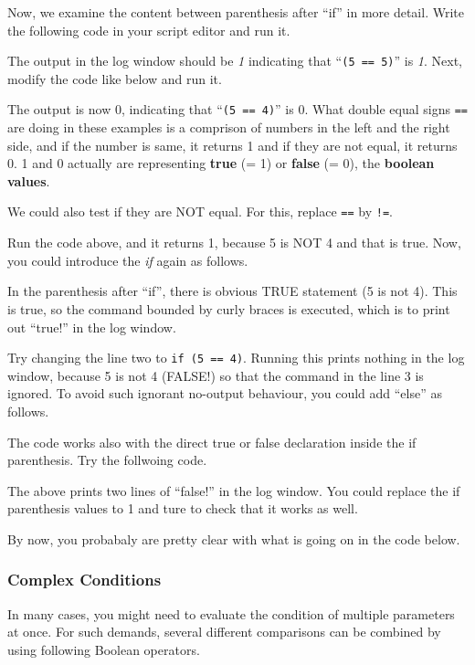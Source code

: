 \documentclass[11pt,a4paper,oneside]{report}
\newcommand{\ilcom}[1]{\texttt{\small#1}}
\begin{document}
Now, we examine the content between 
parenthesis after ``if'' in more detail. 
Write the following code in your script editor and run it.

The output in the log window should be \textit{1} indicating that ``\ilcom{(5 ==
5)}'' is \textit{1}. Next, modify the code like below and run it.

The output is now 0, indicating that ``\ilcom{(5 == 4)}'' is
0.
What double equal signs \ilcom{==} are doing in these
examples is a comprison of numbers in the left and the right side, and if
the number is same, it returns 1 and if they are not equal, it returns 0. 1 and
0 actually are representing \textbf{true} (= 1) or \textbf{false} (= 0), the
\textbf{boolean values}.

We could also test if they are NOT equal. For this, replace \ilcom{==} by
\ilcom{!=}.

Run the code above, and it returns 1, because 5 is NOT 4 and that is true. Now,
you could introduce the \textit{if} again as follows.

In the parenthesis after ``if'', there is obvious TRUE statement (5 is not 4).
This is true, so the command bounded by curly braces is executed, which is to
print out ``true!'' in the log window.

Try changing the line two to \ilcom{if (5 == 4)}. Running this prints nothing
in the log window, because 5 is not 4 (FALSE!) so that the command in
the line 3 is ignored. To avoid such ignorant no-output behaviour, you could add
``else'' as follows.



The code works also with the direct true or false
declaration inside the if parenthesis. Try the follwoing code.



The above prints two lines of ``false!'' in the log window. You could replace
the if parenthesis values to 1 and ture to check that it works as well. 

By now, you probabaly are pretty clear with what is going on in the code below. 


\subsubsection{Complex Conditions}
In many cases, you might need to evaluate the condition of multiple parameters at once. 
For such demands, several different comparisons can be combined by using following Boolean operators. 
\end{document}
